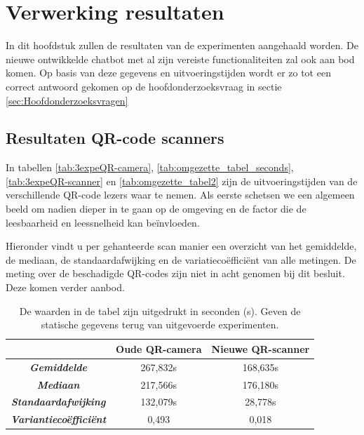 
\chapter{Verwerking resultaten}%
\label{ch:verwerkingresultaten}

In dit hoofdstuk zullen de resultaten van de experimenten aangehaald worden. De nieuwe ontwikkelde chatbot met al zijn vereiste functionaliteiten zal ook aan bod komen. Op basis van deze gegevens en uitvoeringstijden wordt er zo tot een correct antwoord gekomen op de hoofdonderzoeksvraag in sectie \ref{sec:Hoofdonderzoeksvragen}


\section{Resultaten QR-code scanners}
\label{sec:resultatenQR-codeScanners}

In tabellen \ref{tab:3expeQR-camera}, \ref{tab:omgezette_tabel_seconds}, \ref{tab:3expeQR-scanner} en \ref{tab:omgezette_tabel2} zijn de uitvoeringstijden van de verschillende QR-code lezers waar te nemen. Als eerste schetsen we een algemeen beeld om nadien dieper in te gaan op de omgeving en de factor die de leesbaarheid en leessnelheid kan beïnvloeden. 

Hieronder vindt u per gehanteerde scan manier een overzicht van het gemiddelde, de mediaan, de standaardafwijking en de variatiecoëfficiënt van alle metingen. De meting over de beschadigde QR-codes zijn niet in acht genomen bij dit besluit. Deze komen verder aanbod.


\begin{table}[h]
    \centering
    \begin{tabular}{ |c|c|c| }
        \hline
        \multicolumn{1}{|c|}{} & \textbf{Oude QR-camera} & \textbf{Nieuwe QR-scanner} \\       
        \hline
        \textbf{\textit{Gemiddelde}} & 267,832s & 168,635s \\
        \hline
        \textbf{\textit{Mediaan}} & 217,566s & 176,180s \\
        \hline        
        \textbf{\textit{Standaardafwijking}} & 132,079s & 28,778s \\
        \hline
        \textbf{\textit{Variantiecoëfficiënt}} & 0,493 & 0,018 \\
        \hline
    \end{tabular}
    \captionsetup{justification=centering}
    \caption{De waarden in de tabel zijn uitgedrukt in seconden (s). Geven de statische gegevens terug van uitgevoerde experimenten.}
    \label{tab:nieuweScanner}
\end{table}

